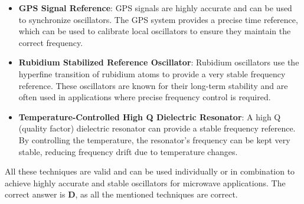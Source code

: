 \begin{itemize}
    \item \textbf{GPS Signal Reference}: GPS signals are highly accurate and can be used to synchronize oscillators. The GPS system provides a precise time reference, which can be used to calibrate local oscillators to ensure they maintain the correct frequency.
    
    \item \textbf{Rubidium Stabilized Reference Oscillator}: Rubidium oscillators use the hyperfine transition of rubidium atoms to provide a very stable frequency reference. These oscillators are known for their long-term stability and are often used in applications where precise frequency control is required.
    
    \item \textbf{Temperature-Controlled High Q Dielectric Resonator}: A high Q (quality factor) dielectric resonator can provide a stable frequency reference. By controlling the temperature, the resonator's frequency can be kept very stable, reducing frequency drift due to temperature changes.
\end{itemize}

All these techniques are valid and can be used individually or in combination to achieve highly accurate and stable oscillators for microwave applications. The correct answer is \textbf{D}, as all the mentioned techniques are correct.

